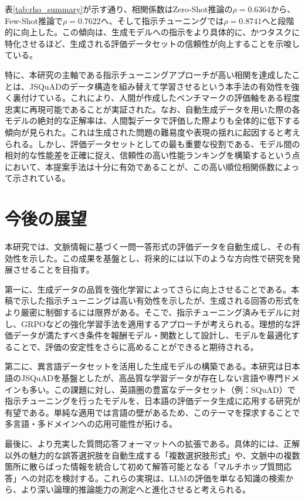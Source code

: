 \documentclass[twocolumn]{jsarticle}
\begin{document}
表\ref{tab:rho_summary}が示す通り、相関係数はZero-Shot推論の$\rho=0.6364$から、Few-Shot推論で$\rho=0.7622$へ、そして指示チューニングでは$\rho=0.8741$へと段階的に向上した。この傾向は、生成モデルへの指示をより具体的に、かつタスクに特化させるほど、生成される評価データセットの信頼性が向上することを示唆している。

特に、本研究の主軸である指示チューニングアプローチが高い相関を達成したことは、JSQuADのデータ構造を組み替えて学習させるという本手法の有効性を強く裏付けている。これにより、人間が作成したベンチマークの評価軸をある程度忠実に再現可能であることが実証された。なお、自動生成データを用いた際の各モデルの絶対的な正解率は、人間製データで評価した際よりも全体的に低下する傾向が見られた。これは生成された問題の難易度や表現の揺れに起因すると考えられる。しかし、評価データセットとしての最も重要な役割である、モデル間の相対的な性能差を正確に捉え、信頼性の高い性能ランキングを構築するという点において、本提案手法は十分に有効であることが、この高い順位相関係数によって示されている。



\section{今後の展望}

本研究では、文脈情報に基づく一問一答形式の評価データを自動生成し、その有効性を示した。この成果を基盤とし、将来的には以下のような方向性で研究を発展させることを目指す。

第一に、生成データの品質を強化学習によってさらに向上させることである。本稿で示した指示チューニングは高い有効性を示したが、生成される回答の形式をより厳密に制御するには限界がある。そこで、指示チューニング済みモデルに対し、GRPOなどの強化学習手法を適用するアプローチが考えられる。理想的な評価データが満たすべき条件を報酬モデル・関数として設計し、モデルを最適化することで、評価の安定性をさらに高めることができると期待される。

第二に、異言語データセットを活用した生成モデルの構築である。本研究は日本語のJSQuAD\cite{JGLUE}を基盤としたが、高品質な学習データが存在しない言語や専門ドメインも多い。この課題に対し、英語圏の豊富なデータセット（例：SQuAD\cite{SQuAD}）で指示チューニングを行ったモデルを、日本語の評価データ生成に応用する研究が有望である。単純な適用では言語の壁があるため、このテーマを探求することで多言語・多ドメインへの応用可能性が拓ける。

最後に、より充実した質問応答フォーマットへの拡張である。具体的には、正解以外の魅力的な誤答選択肢を自動生成する「複数選択肢形式」や、文脈中の複数箇所に散らばった情報を統合して初めて解答可能となる「マルチホップ質問応答」への対応を検討する。これらの実現は、LLMの評価を単なる知識の検索から、より深い論理的推論能力の測定へと進化させると考えられる。
\end{document}
